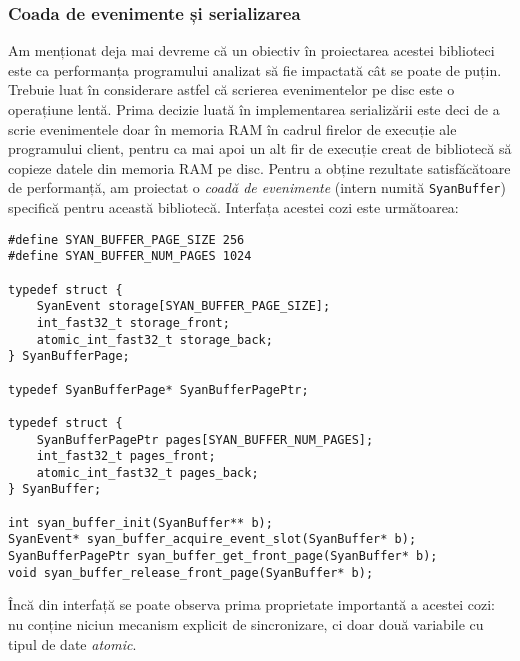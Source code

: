 \subsubsection{Coada de evenimente și serializarea}\label{section:queue}

Am menționat deja mai devreme că un obiectiv în proiectarea acestei
biblioteci este ca performanța programului analizat să fie impactată cât
se poate de puțin. Trebuie luat în considerare astfel că scrierea
evenimentelor pe disc este o operațiune lentă. Prima decizie luată în
implementarea serializării este deci de a scrie evenimentele doar în
memoria RAM în cadrul firelor de execuție ale programului client, pentru
ca mai apoi un alt fir de execuție creat de bibliotecă să copieze datele
din memoria RAM pe disc. Pentru a obține rezultate satisfăcătoare de
performanță, am proiectat o \textit{coadă de evenimente} (intern numită
\lstinline{SyanBuffer}) specifică pentru această bibliotecă. Interfața
acestei cozi este următoarea:

\begin{lstlisting}[caption=Interfața cozii de evenimente folosite în
                           bibliotecă]
#define SYAN_BUFFER_PAGE_SIZE 256
#define SYAN_BUFFER_NUM_PAGES 1024

typedef struct {
    SyanEvent storage[SYAN_BUFFER_PAGE_SIZE];
    int_fast32_t storage_front;
    atomic_int_fast32_t storage_back;
} SyanBufferPage;

typedef SyanBufferPage* SyanBufferPagePtr;

typedef struct {
    SyanBufferPagePtr pages[SYAN_BUFFER_NUM_PAGES];
    int_fast32_t pages_front;
    atomic_int_fast32_t pages_back;
} SyanBuffer;

int syan_buffer_init(SyanBuffer** b);
SyanEvent* syan_buffer_acquire_event_slot(SyanBuffer* b);
SyanBufferPagePtr syan_buffer_get_front_page(SyanBuffer* b);
void syan_buffer_release_front_page(SyanBuffer* b);
\end{lstlisting}

Încă din interfață se poate observa prima proprietate importantă a
acestei cozi: nu conține niciun mecanism explicit de sincronizare, ci
doar două variabile cu tipul de date \textit{atomic}.

